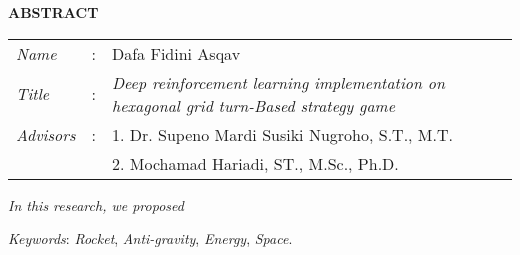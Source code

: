 \begin{center}
  \large\textbf{ABSTRACT}
\end{center}


\vspace{2ex}

\begingroup
  \setlength{\tabcolsep}{0pt}

  \noindent
  \begin{tabularx}{\textwidth}{l >{\centering}m{3em} X}
    \emph{Name}     &:& Dafa Fidini Asqav \\

    \emph{Title}    &:& \emph{Deep reinforcement learning implementation on hexagonal grid turn-Based strategy game} \\

    \emph{Advisors} &:& 1. Dr. Supeno Mardi Susiki Nugroho, S.T., M.T. \\
                    & & 2. Mochamad Hariadi, ST., M.Sc., Ph.D. \\
  \end{tabularx}
\endgroup

\emph{In this research, we proposed \lipsum[1]}

\emph{Keywords}: \emph{Rocket}, \emph{Anti-gravity}, \emph{Energy}, \emph{Space}.
